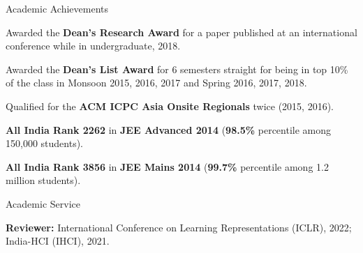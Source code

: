 \documentclass{resume} %
\begin{document}
\begin{rSection}{Academic Achievements} \itemsep -5pt
\item Awarded the \textbf{Dean's Research Award} for a paper published at an international conference while in undergraduate, 2018.
\item Awarded the \textbf{Dean's List Award} for 6 semesters straight for being in top 10\% of the class in Monsoon 2015, 2016, 2017 and Spring 2016, 2017, 2018.
\item Qualified for the \textbf{ACM ICPC Asia Onsite Regionals} twice (2015, 2016).
\item \textbf{All India Rank 2262} in \textbf{JEE Advanced 2014} (\textbf{98.5\%} percentile among 150,000 students).
\item \textbf{All India Rank 3856} in \textbf{JEE Mains 2014} (\textbf{99.7\%} percentile among 1.2 million students).
\end{rSection}

\begin{rSection}{Academic Service} \itemsep -5pt
\item \textbf{Reviewer:} International Conference on Learning Representations (ICLR), 2022; India-HCI (IHCI), 2021. 
\end{rSection}
\end{document}
